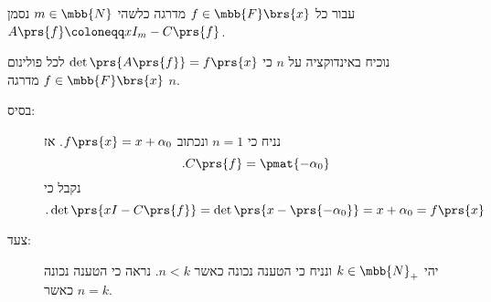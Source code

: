 \documentclass[a4paper,10pt,twoside,openany]{article}
\begin{document}
\begin{solution}
עבור כל
$f \in \mbb{F}\brs{x}$
מדרגה כלשהי
$m \in \mbb{N}$
נסמן
$A\prs{f} \coloneqq xI_m - C\prs{f}$.

נוכיח באינדוקציה על
$n$
כי
$\det\prs{A\prs{f}} = f\prs{x}$
לכל פולינום
$f \in \mbb{F}\brs{x}$
מדרגה
$n$.

\begin{description}
\item[בסיס:]
נניח כי
$n = 1$
ונכתוב
$f\prs{x} = x + \alpha_0$.
אז
\[\text{.} C\prs{f} = \pmat{-\alpha_0}\]
נקבל כי
\[\text{.} \det\prs{x I - C\prs{f}} = \det\prs{x - \prs{-\alpha_0}} = x + \alpha_0 = f\prs{x}\]

\item[צעד:]
יהי
$k \in \mbb{N}_+$
ונניח כי הטענה נכונה כאשר
$n < k$.
נראה כי הטענה נכונה כאשר
$n = k$.


\end{description}
\end{solution}
\end{document}
